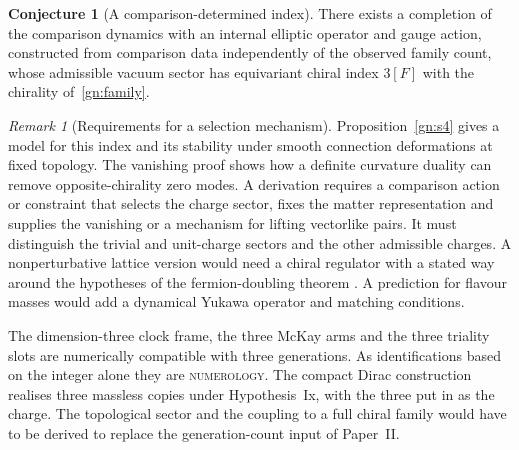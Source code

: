 \documentclass[aps,pra,onecolumn,superscriptaddress,nofootinbib,10pt]{revtex4-2}
\theoremstyle{definition}
\newtheorem{conjecture}[theorem]{Conjecture}
\theoremstyle{remark}
\newtheorem{remark}[theorem]{Remark}
\begin{document}
\begin{conjecture}[A comparison-determined index]\label{gn:conjecture}
There exists a completion of the comparison dynamics with an
internal elliptic operator and gauge action, constructed from
comparison data independently of the observed family count,
whose admissible vacuum sector has equivariant chiral index
$3[F]$ with the chirality of~\eqref{gn:family}.
\end{conjecture}
\begin{remark}[Requirements for a selection mechanism]\label{gn:programme}
Proposition~\ref{gn:s4} gives a model for this index and its stability
under smooth connection deformations at fixed topology. The
vanishing proof shows how a definite curvature duality can remove
opposite-chirality zero modes. A derivation requires a comparison
action or constraint that selects the charge sector, fixes the
matter representation and supplies the vanishing or a mechanism for
lifting vectorlike pairs. It must distinguish the trivial and
unit-charge sectors and the other admissible charges. A
nonperturbative lattice version would need a chiral regulator
with a stated way around the hypotheses of the fermion-doubling
theorem \cite{gn:nn}. A prediction for flavour masses would
add a dynamical Yukawa operator and matching conditions.

The dimension-three clock frame, the three McKay arms and the
three triality slots are numerically compatible with three
generations. As identifications based on the integer alone they
are \textsc{numerology}. The compact Dirac construction realises
three massless copies under Hypothesis~Ix, with the three put in as the charge. The
topological sector and the coupling to a full chiral family
would have to be derived to replace the generation-count input of
Paper~II.
\end{remark}
\end{document}
